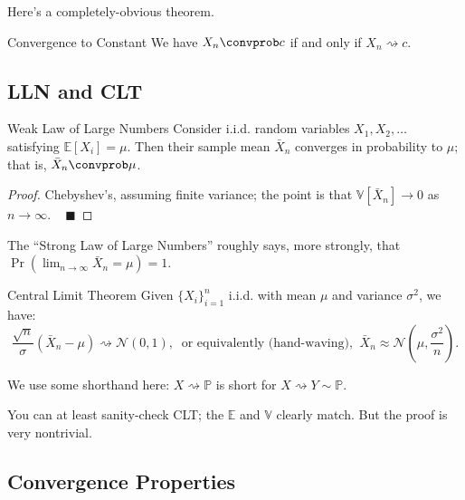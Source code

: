 Here's a completely-obvious theorem.

\begin{theorem}{Convergence to Constant}
    We have $X_n \convprob c$ if and only if $X_n \rightsquigarrow c$.
\end{theorem}

\subsection{LLN and CLT}

\begin{theorem}{Weak Law of Large Numbers}
    Consider i.i.d. random variables $X_1, X_2, \dots$ satisfying
    $\mathbb{E}[X_i] = \mu$.  Then their sample mean $\bar{X}_n$ converges
    in probability to $\mu$; that is, $\bar{X}_n \convprob \mu$.
\end{theorem}

\begin{proof}
    Chebyshev's, assuming finite variance; the point is that $\mathbb{V}[\bar{X}_n] \to 0$
    as $n \to \infty$. ~ $\blacksquare$
\end{proof}

\begin{remark}
    The ``Strong Law of Large Numbers'' roughly says, more strongly,
    that $\Pr(\lim_{n \to \infty} \bar{X}_n = \mu) = 1$.
\end{remark}

\begin{theorem}{Central Limit Theorem}
    Given $\{X_i\}_{i = 1}^n$ i.i.d. with mean $\mu$ and variance $\sigma^2$, we have:
    \[ \dfrac{\sqrt{n}}{\sigma}(\bar{X}_n - \mu) \rightsquigarrow \mathcal{N}(0, 1), ~
    \text{ or equivalently (hand-waving), } ~
     \bar{X}_n \approx \mathcal{N}\left(\mu, \dfrac{\sigma^2}{n}\right). \]
\end{theorem}

\begin{remark}
    We use some shorthand here: $X \rightsquigarrow \mathbb{P}$ is short
    for $X \rightsquigarrow Y \sim \mathbb{P}$.
\end{remark}

You can at least sanity-check CLT; the $\mathbb{E}$ and $\mathbb{V}$ clearly match.
But the proof is very nontrivial.

\subsection{Convergence Properties}

